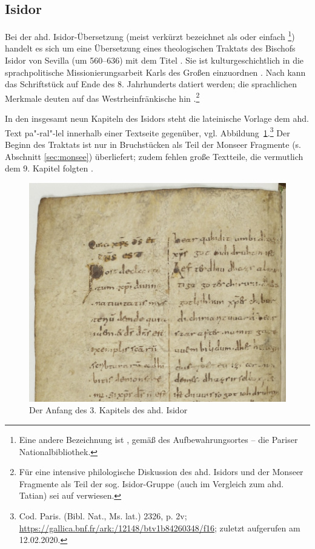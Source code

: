 \subsection{Isidor} \label{sec:isidor}

Bei der  ahd. Isidor-Übersetzung (meist verkürzt bezeichnet als  oder einfach \footnote{Eine andere Bezeichnung ist , gemäß des Aufbewahrungsortes -- die Pariser Nationalbibliothek.}) handelt es sich um eine Übersetzung eines theologischen Traktats des Bischofs Isidor von Sevilla (um 560--636) mit dem Titel . Sie ist kulturgeschichtlich in die sprachpolitische Missionierungsarbeit Karls des Großen einzuordnen \parencite[vgl.][36--38]{Schlachter2012}. Nach \textcite[VIII][]{Eggers1964} kann das Schriftstück auf Ende des 8. Jahrhunderts datiert werden; die sprachlichen Merkmale deuten auf das Westrheinfränkische hin \parencite{Matzel1970}.\footnote{Für eine intensive philologische Diskussion des ahd. Isidors und der Monseer Fragmente als Teil der sog. Isidor-Gruppe (auch im Vergleich zum ahd. Tatian) sei auf \textcite[17--53]{Schlachter2012} verwiesen.} 

In den insgesamt neun Kapiteln des Isidors steht die lateinische Vorlage dem ahd. Text pa"-ral"-lel innerhalb einer Textseite gegenüber, vgl. Abbildung~\ref{abb:isidor4}.\footnote{Cod. Paris. (Bibl. Nat., Ms. lat.) 2326, p. 2v; 
\url{https://gallica.bnf.fr/ark:/12148/btv1b84260348/f16}; zuletzt aufgerufen am 12.02.2020.} Der Beginn des Traktats ist nur in Bruchstücken als Teil der Monseer Fragmente (s. Abschnitt \ref{sec:monsee}) überliefert; zudem fehlen große Textteile, die vermutlich dem 9. Kapitel folgten \parencite[25]{Schlachter2012}.

\begin{figure}[h]
\begin{center}
  \includegraphics[width=10 cm]{images/isidor-kap-3-ausschnitt.jpg}
  \caption {Der Anfang des 3. Kapitels des ahd. Isidor}
\label{abb:isidor4}
\end{center}
\end{figure} 

